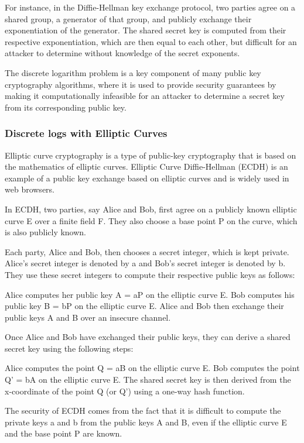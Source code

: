 \documentclass{article}
\begin{document}
For instance, in the Diffie-Hellman key exchange protocol, two parties agree on a shared group, a generator of that group, and publicly exchange their exponentiation of the generator. The shared secret key is computed from their respective exponentiation, which are then equal to each other, but difficult for an attacker to determine without knowledge of the secret exponents.

The discrete logarithm problem is a key component of many public key cryptography algorithms, where it is used to provide security guarantees by making it computationally infeasible for an attacker to determine a secret key from its corresponding public key.

\subsubsection{Discrete logs with Elliptic Curves}
Elliptic curve cryptography is a type of public-key cryptography that is based on the mathematics of elliptic curves. Elliptic Curve Diffie-Hellman (ECDH) is an example of a public key exchange based on elliptic curves and is widely used in web browsers.

In ECDH, two parties, say Alice and Bob, first agree on a publicly known elliptic curve E over a finite field F. They also choose a base point P on the curve, which is also publicly known.

Each party, Alice and Bob, then chooses a secret integer, which is kept private. Alice's secret integer is denoted by a and Bob's secret integer is denoted by b. They use these secret integers to compute their respective public keys as follows:

Alice computes her public key A = aP on the elliptic curve E.
Bob computes his public key B = bP on the elliptic curve E.
Alice and Bob then exchange their public keys A and B over an insecure channel.

Once Alice and Bob have exchanged their public keys, they can derive a shared secret key using the following steps:

Alice computes the point Q = aB on the elliptic curve E.
Bob computes the point Q' = bA on the elliptic curve E.
The shared secret key is then derived from the x-coordinate of the point Q (or Q') using a one-way hash function.

The security of ECDH comes from the fact that it is difficult to compute the private keys a and b from the public keys A and B, even if the elliptic curve E and the base point P are known.
\end{document}
